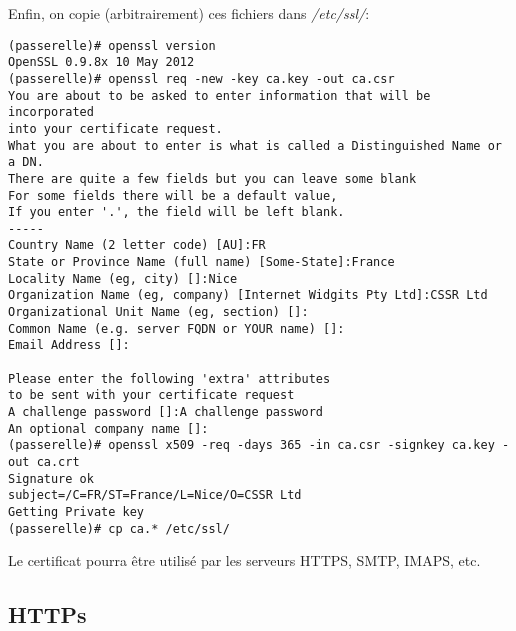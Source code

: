 Enfin, on copie (arbitrairement) ces fichiers dans \textit{/etc/ssl/}:
\begin{verbatim}
(passerelle)# openssl version
OpenSSL 0.9.8x 10 May 2012
(passerelle)# openssl req -new -key ca.key -out ca.csr
You are about to be asked to enter information that will be incorporated
into your certificate request.
What you are about to enter is what is called a Distinguished Name or a DN.
There are quite a few fields but you can leave some blank
For some fields there will be a default value,
If you enter '.', the field will be left blank.
-----
Country Name (2 letter code) [AU]:FR
State or Province Name (full name) [Some-State]:France
Locality Name (eg, city) []:Nice
Organization Name (eg, company) [Internet Widgits Pty Ltd]:CSSR Ltd
Organizational Unit Name (eg, section) []:
Common Name (e.g. server FQDN or YOUR name) []:
Email Address []:

Please enter the following 'extra' attributes
to be sent with your certificate request
A challenge password []:A challenge password
An optional company name []:
(passerelle)# openssl x509 -req -days 365 -in ca.csr -signkey ca.key -out ca.crt
Signature ok
subject=/C=FR/ST=France/L=Nice/O=CSSR Ltd
Getting Private key
(passerelle)# cp ca.* /etc/ssl/
\end{verbatim}

Le certificat pourra être utilisé par les serveurs HTTPS, SMTP, IMAPS, etc.

\subsection{HTTPs}
